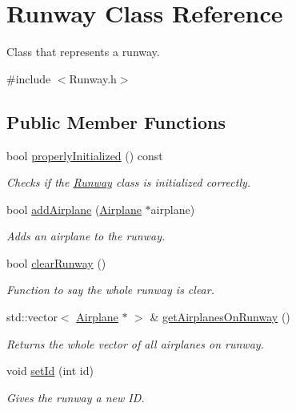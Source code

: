 \hypertarget{class_runway}{}\section{Runway Class Reference}
\label{class_runway}


Class that represents a runway.  




{\ttfamily \#include $<$Runway.\+h$>$}

\subsection*{Public Member Functions}
\begin{DoxyCompactItemize}
\item 
bool \mbox{\hyperlink{class_runway_a360d98246cabf3aa929765f81a656348}{properly\+Initialized}} () const
\begin{DoxyCompactList}\small\item\em Checks if the \mbox{\hyperlink{class_runway}{Runway}} class is initialized correctly. \end{DoxyCompactList}\item 
bool \mbox{\hyperlink{class_runway_ae07554e4e41faea8ef9654385449b25b}{add\+Airplane}} (\mbox{\hyperlink{class_airplane}{Airplane}} $\ast$airplane)
\begin{DoxyCompactList}\small\item\em Adds an airplane to the runway. \end{DoxyCompactList}\item 
bool \mbox{\hyperlink{class_runway_ae339230720ad45aa3997e90c2acaf744}{clear\+Runway}} ()
\begin{DoxyCompactList}\small\item\em Function to say the whole runway is clear. \end{DoxyCompactList}\item 
std\+::vector$<$ \mbox{\hyperlink{class_airplane}{Airplane}} $\ast$ $>$ \& \mbox{\hyperlink{class_runway_a5e44b199b4e267f41b6e9710a519e720}{get\+Airplanes\+On\+Runway}} ()
\begin{DoxyCompactList}\small\item\em Returns the whole vector of all airplanes on runway. \end{DoxyCompactList}\item 
void \mbox{\hyperlink{class_runway_af587fc8f841c10a99427cf7a0f442fce}{set\+Id}} (int id)
\begin{DoxyCompactList}\small\item\em Gives the runway a new ID. \end{DoxyCompactList}\item 

\end{DoxyCompactItemize}
